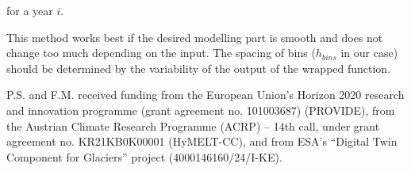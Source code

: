 \documentclass[journal abbreviation, manuscript]{copernicus}
\begin{document}
for a year $i$.

This method works best if the desired modelling part is smooth and does not change too much depending on the input. The spacing of bins ($h_{bins}$ in our case) should be determined by the variability of the output of the wrapped function.

\noappendix       %












\begin{acknowledgements}
P.S. and F.M. received funding from the European Union’s Horizon 2020 research and innovation programme (grant agreement no. 101003687) (PROVIDE), from the Austrian Climate Research Programme (ACRP) – 14th call, under grant agreement no. KR21KB0K00001 (HyMELT-CC), and from ESA's “Digital Twin Component for Glaciers” project (4000146160/24/I-KE).
\end{acknowledgements}
\end{document}
